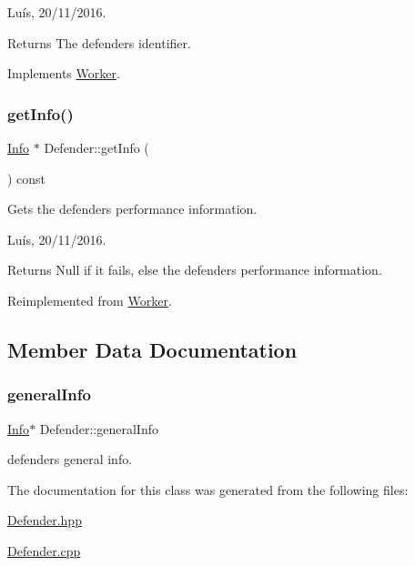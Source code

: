 Luís, 20/11/2016. 

\begin{DoxyReturn}{Returns}
The defender\textquotesingle{}s identifier. 
\end{DoxyReturn}


Implements \hyperlink{class_worker_a8b3e221c4a1ebd12ade03ee9b9c86182}{Worker}.

\hypertarget{class_defender_a54de21eac6353f8847ac109b8a08fcab}{}\label{class_defender_a54de21eac6353f8847ac109b8a08fcab} 
\subsubsection{\texorpdfstring{get\+Info()}{getInfo()}}
{\footnotesize\ttfamily \hyperlink{class_info}{Info} $\ast$ Defender\+::get\+Info (\begin{DoxyParamCaption}{ }\end{DoxyParamCaption}) const\hspace{0.3cm}{\ttfamily [virtual]}}



Gets the defender\textquotesingle{}s performance information. 

Luís, 20/11/2016. 

\begin{DoxyReturn}{Returns}
Null if it fails, else the defender\textquotesingle{}s performance information. 
\end{DoxyReturn}


Reimplemented from \hyperlink{class_worker_a95a4f7c750644937859b8e14515a480e}{Worker}.



\subsection{Member Data Documentation}
\hypertarget{class_defender_a849c8836a0dff2abd8df7a8d6434cc8c}{}\label{class_defender_a849c8836a0dff2abd8df7a8d6434cc8c} 
\subsubsection{\texorpdfstring{general\+Info}{generalInfo}}
{\footnotesize\ttfamily \hyperlink{class_info}{Info}$\ast$ Defender\+::general\+Info\hspace{0.3cm}{\ttfamily [private]}}



defender\textquotesingle{}s general info. 



The documentation for this class was generated from the following files\+:\begin{DoxyCompactItemize}
\item 
\hyperlink{_defender_8hpp}{Defender.\+hpp}\item 
\hyperlink{_defender_8cpp}{Defender.\+cpp}\end{DoxyCompactItemize}
